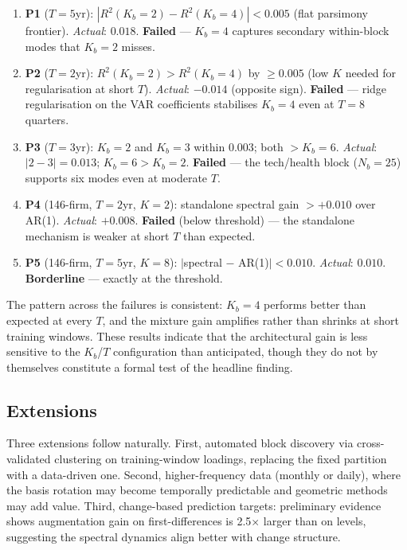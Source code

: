 \documentclass[11pt,a4paper]{article}
\begin{document}
\begin{enumerate}[nosep]
  \item \textbf{P1} ($T{=}5$yr): $|R^2(K_b{=}2) - R^2(K_b{=}4)| < 0.005$ (flat parsimony frontier). \emph{Actual}: $0.018$. \textbf{Failed} --- $K_b{=}4$ captures secondary within-block modes that $K_b{=}2$ misses.
  \item \textbf{P2} ($T{=}2$yr): $R^2(K_b{=}2) > R^2(K_b{=}4)$ by $\geq 0.005$ (low $K$ needed for regularisation at short $T$). \emph{Actual}: $-0.014$ (opposite sign). \textbf{Failed} --- ridge regularisation on the VAR coefficients stabilises $K_b{=}4$ even at $T{=}8$ quarters.
  \item \textbf{P3} ($T{=}3$yr): $K_b{=}2$ and $K_b{=}3$ within $0.003$; both $> K_b{=}6$. \emph{Actual}: $|2-3| = 0.013$; $K_b{=}6 > K_b{=}2$. \textbf{Failed} --- the tech/health block ($N_b{=}25$) supports six modes even at moderate $T$.
  \item \textbf{P4} (146-firm, $T{=}2$yr, $K{=}2$): standalone spectral gain $> +0.010$ over AR(1). \emph{Actual}: $+0.008$. \textbf{Failed} (below threshold) --- the standalone mechanism is weaker at short $T$ than expected.
  \item \textbf{P5} (146-firm, $T{=}5$yr, $K{=}8$): $|$spectral $-$ AR(1)$| < 0.010$. \emph{Actual}: $0.010$. \textbf{Borderline} --- exactly at the threshold.
\end{enumerate}

The pattern across the failures is consistent: $K_b{=}4$ performs better than expected at every $T$, and the mixture gain amplifies rather than shrinks at short training windows. These results indicate that the architectural gain is less sensitive to the $K_b$/$T$ configuration than anticipated, though they do not by themselves constitute a formal test of the headline finding.

\subsection{Extensions}

Three extensions follow naturally. First, automated block discovery via cross-validated clustering on training-window loadings, replacing the fixed partition with a data-driven one. Second, higher-frequency data (monthly or daily), where the basis rotation may become temporally predictable and geometric methods may add value. Third, change-based prediction targets: preliminary evidence shows augmentation gain on first-differences is 2.5$\times$ larger than on levels, suggesting the spectral dynamics align better with change structure.
\end{document}
